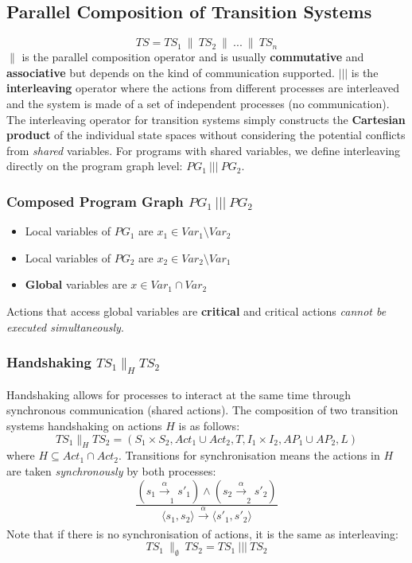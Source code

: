 \documentclass[11pt]{article}
\theoremstyle{definition}
\begin{document}
\subsection{Parallel Composition of Transition Systems}
\begin{equation}
TS = TS_{1}\ \|\ TS_{2}\ \|\ ...\ \|\ TS_{n}
\end{equation}
$\|$ is the parallel composition operator and is usually \textbf{commutative} and \textbf{associative} but depends on the kind of communication supported.
\n
$|||$ is the \textbf{interleaving} operator where the actions from different processes are interleaved and the system is made of a set of independent processes (no communication).
\n
The interleaving operator for transition systems simply constructs the \textbf{Cartesian product} of the individual state spaces without considering the potential conflicts from \textit{shared} variables. For programs with shared variables, we define interleaving directly on the program graph level: $PG_{1}\ |||\ PG_{2}$.

\subsubsection{Composed Program Graph $PG_{1}\ |||\ PG_{2}$}
\begin{itemize}
\item Local variables of $PG_{1}$ are $x_{1} \in Var_{1} \setminus Var_{2}$
\item Local variables of $PG_{2}$ are $x_{2} \in Var_{2} \setminus Var_{1}$
\item \textbf{Global} variables are $x \in Var_{1} \cap Var_{2}$
\end{itemize}
Actions that access global variables are \textbf{critical} and critical actions \textit{cannot be executed simultaneously}.


\subsubsection{Handshaking $TS_{1} \|_{H} TS_{2}$}
Handshaking allows for processes to interact at the same time through synchronous communication (shared actions). The composition of two transition systems handshaking on actions $H$ is as follows:
\begin{equation}
TS_{1} \|_{H} TS_{2} = (S_{1} \times S_{2}, Act_{1} \cup Act_{2}, T, I_{1} \times I_{2}, AP_{1} \cup AP_{2}, L)
\end{equation}
where $H \subseteq Act_{1} \cap Act_{2}$.
\n
Transitions for synchronisation means the actions in $H$ are taken \textit{synchronously} by both processes:
\begin{equation}
\frac{(s_{1} \xrightarrow[]{\alpha}_{1} s'_{1}) \wedge (s_{2} \xrightarrow[]{\alpha}_{2} s'_{2})}{\langle s_{1}, s_{2} \rangle \xrightarrow[]{\alpha} \langle s'_{1}, s'_{2} \rangle}
\end{equation}
Note that if there is no synchronisation of actions, it is the same as interleaving:
\begin{equation}
TS_{1}\ \|_{\emptyset}\ TS_{2} = TS_{1}\ |||\ TS_{2}
\end{equation}
\end{document}
